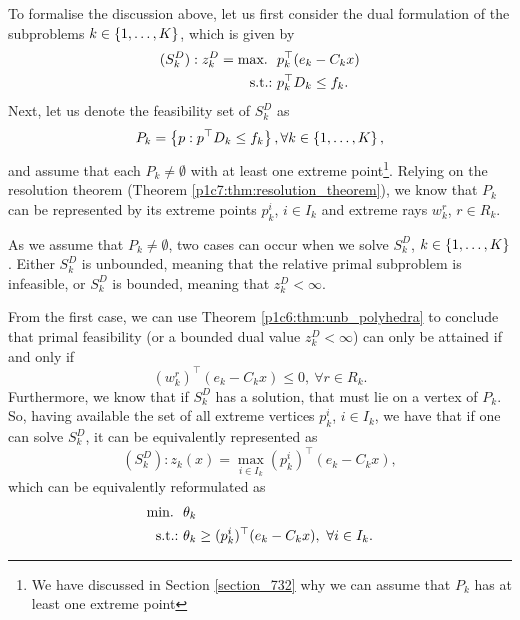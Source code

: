 To formalise the discussion above, let us first consider the dual formulation of the subproblems $k \in \left\{ 1,\dots, K \right \}$, which is given by
%
\begin{align*}
	(S^D_k) : z^D_k = \mathop{\text{max.~}} \ & p_k^\top (e_k - C_k x) \\
	\mathop{\text{s.t.:~}}   & p_k^\top D_k \leq f_k.	 
\end{align*}
%
Next, let us denote the feasibility set of $S^D_k$ as 
%
\begin{equation}
	P_k =\left\{ p : p^\top D_k \leq f_k \right \}, \forall k \in \left\{ 1,\dots,K \right \}, 
\end{equation}
%
and assume that each $P_k \neq \emptyset$ with at least one extreme point\footnote{We have discussed in Section \ref{section_732} why we can assume that $P_k$ has at least one extreme point}. Relying on the resolution theorem (Theorem \ref{p1c7:thm:resolution_theorem}), we know that $P_k$ can be represented by its extreme points $p_k^i$, $i \in I_k$ and extreme rays $w^r_k$, $r \in R_k$.

As we assume that $P_k \neq \emptyset$, two cases can occur when we solve $S^D_k$, $k \in \left\{ 1,\dots, K \right \}$. Either $S^D_k$ is unbounded, meaning that the relative primal subproblem is infeasible, or $S^D_k$ is bounded, meaning that $z^D_k < \infty$.

From the first case, we can use Theorem \ref{p1c6:thm:unb_polyhedra} to conclude that primal feasibility (or a bounded dual value $z^D_k < \infty$) can only be attained if and only if
%
\begin{equation}
	(w^r_k)^\top (e_k - C_k x) \leq 0, \ \forall r \in R_k. \label{p1c7:eq:feas_cut_all}	
\end{equation}
%
Furthermore, we know that if $S^D_k$ has a solution, that must lie on a vertex of $P_k$. So, having  available the set of all extreme vertices $p_k^i$, $i \in I_k$, we have that if one can solve $S^D_k$, it can be equivalently represented as
%
\begin{equation*}
	(S^D_k) : z_k(x) = \max_{i \in I_k} (p^i_k)^\top (e_k - C_k x),
\end{equation*}   
%
which can be equivalently reformulated as
\begin{align}
	\mathop{\text{min.~}} \ & \theta_k \label{p1c7:eq:opt_cut_all1} \\
	\mathop{\text{s.t.:~}} & \theta_k \geq (p^i_k)^\top (e_k - C_k x), \ \forall i \in I_k. \label{p1c7:eq:opt_cut_all2}
\end{align}

